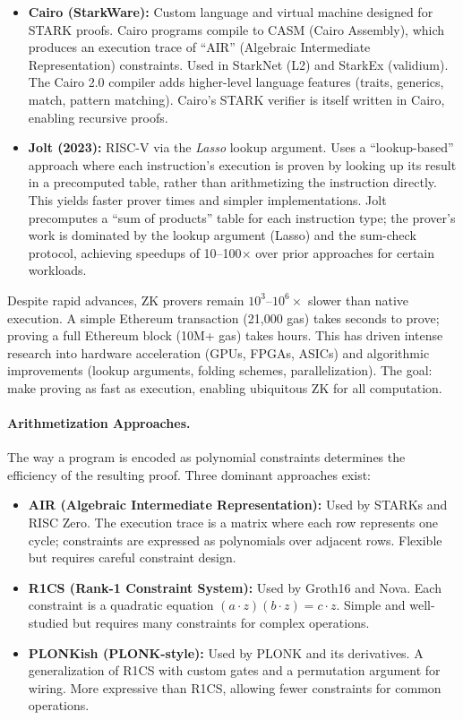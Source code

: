 \begin{itemize}
\item \textbf{Cairo (StarkWare):} Custom language and virtual machine designed for STARK proofs. Cairo programs compile to CASM (Cairo Assembly), which produces an execution trace of ``AIR'' (Algebraic Intermediate Representation) constraints. Used in StarkNet (L2) and StarkEx (validium). The Cairo 2.0 compiler adds higher-level language features (traits, generics, match, pattern matching). Cairo's STARK verifier is itself written in Cairo, enabling recursive proofs.

\item \textbf{Jolt (2023):} RISC-V via the \emph{Lasso} lookup argument. Uses a ``lookup-based'' approach where each instruction's execution is proven by looking up its result in a precomputed table, rather than arithmetizing the instruction directly. This yields faster prover times and simpler implementations. Jolt precomputes a ``sum of products'' table for each instruction type; the prover's work is dominated by the lookup argument (Lasso) and the sum-check protocol, achieving speedups of 10--100$\times$ over prior approaches for certain workloads.
\end{itemize}

Despite rapid advances, ZK provers remain $10^3$--$10^6 \times$ slower than native execution. A simple Ethereum transaction (21,000 gas) takes seconds to prove; proving a full Ethereum block (10M+ gas) takes hours. This has driven intense research into hardware acceleration (GPUs, FPGAs, ASICs) and algorithmic improvements (lookup arguments, folding schemes, parallelization). The goal: make proving as fast as execution, enabling ubiquitous ZK for all computation.

\paragraph{Arithmetization Approaches.} The way a program is encoded as polynomial constraints determines the efficiency of the resulting proof. Three dominant approaches exist:
\begin{itemize}
\item \textbf{AIR (Algebraic Intermediate Representation):} Used by STARKs and RISC Zero. The execution trace is a matrix where each row represents one cycle; constraints are expressed as polynomials over adjacent rows. Flexible but requires careful constraint design.
\item \textbf{R1CS (Rank-1 Constraint System):} Used by Groth16 and Nova. Each constraint is a quadratic equation $(a \cdot z)(b \cdot z) = c \cdot z$. Simple and well-studied but requires many constraints for complex operations.
\item \textbf{PLONKish (PLONK-style):} Used by PLONK and its derivatives. A generalization of R1CS with custom gates and a permutation argument for wiring. More expressive than R1CS, allowing fewer constraints for common operations.
\end{itemize}

